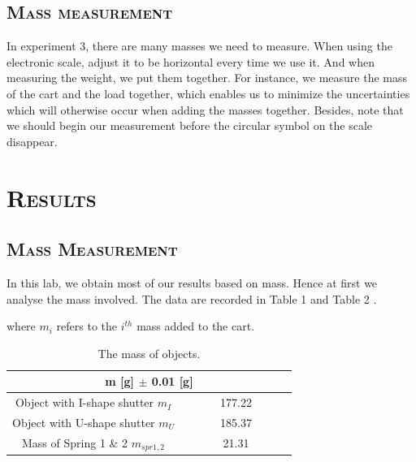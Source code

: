 \documentclass[a4paper,12pt]{article}
\begin{document}
\subsection{\textsc{Mass measurement}}
In experiment 3, there are many masses we need to measure. When using the electronic scale, adjust it to be horizontal every time we use it. And when measuring the weight, we put them together. For instance, we measure the mass of the cart and the load together, which enables us to minimize the uncertainties which will otherwise occur when adding the masses together. Besides, note that we should begin our measurement before the circular symbol on the scale disappear.


\section{\textsc{Results}}
\subsection{\textsc{Mass Measurement}}
In this lab, we obtain most of our results based on mass. Hence at first we analyse the mass involved. The data are recorded in Table 1 and Table 2 .

where $m_i$ refers to the $i^{th}$ mass added to the cart.

\begin{table}[h]
\begin{center}
\begin{tabular}{|c|c|}
\hline
\multicolumn{2}{|c|}{m [g] $\pm$ 0.01 [g]} \\
\hline
Object with I-shape shutter $m_I$ & ~~~~~~177.22~~~~~~ \\
Object with U-shape shutter $m_U$ & 185.37 \\
Mass of Spring 1 \& 2 $m_{spr1,2}$ & 21.31 \\
\hline
\end{tabular}
\end{center}
\caption{The mass of objects.}
\end{table}
\end{document}
